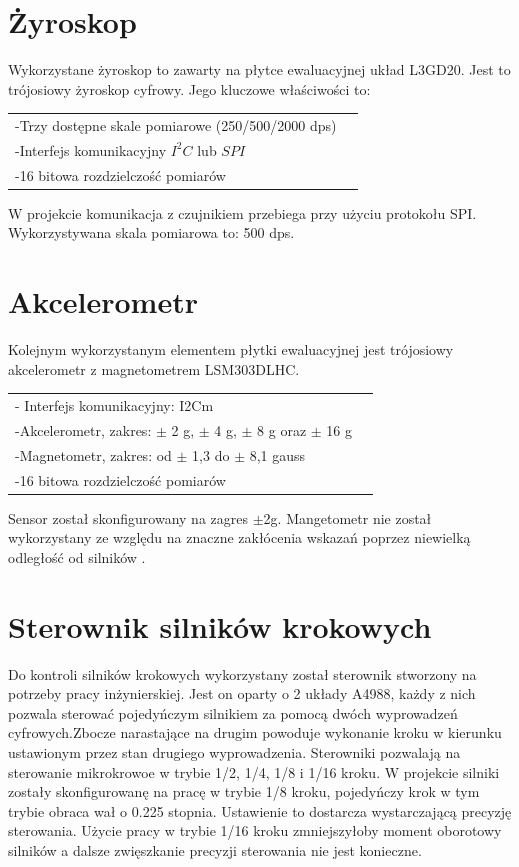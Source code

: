 \section{Żyroskop}

Wykorzystane żyroskop to zawarty na płytce ewaluacyjnej układ L3GD20. Jest to trójosiowy żyroskop cyfrowy. Jego kluczowe właściwości to:

\begin{tabular}{  l   p{3cm} |}
	 -Trzy dostępne skale pomiarowe (250/500/2000 dps) \\
	 -Interfejs komunikacyjny $I^2C$ lub $SPI$\\
	-16 bitowa rozdzielczość pomiarów \\
\end{tabular}  

W projekcie komunikacja z czujnikiem przebiega przy użyciu protokołu SPI. Wykorzystywana skala pomiarowa to: 500 dps.


\section{Akcelerometr}
Kolejnym wykorzystanym elementem płytki ewaluacyjnej jest trójosiowy akcelerometr z magnetometrem LSM303DLHC. 

\begin{tabular}{  l   p{3cm} |}
	- Interfejs komunikacyjny: I2Cm\\
	-Akcelerometr, zakres: $\pm$ 2 g, $\pm$ 4 g, $\pm$ 8 g oraz $\pm$ 16 g\\
	-Magnetometr, zakres:  od $\pm$ 1,3 do $\pm$ 8,1 gauss\\
	-16 bitowa rozdzielczość pomiarów \\
\end{tabular}  


Sensor został skonfigurowany na zagres $\pm$2g. Mangetometr nie został wykorzystany ze względu na znaczne zakłócenia wskazań poprzez niewielką odległość od silników .


\section{Sterownik silników krokowych}

Do kontroli silników krokowych wykorzystany został sterownik stworzony na potrzeby pracy inżynierskiej. Jest on oparty o 2 układy A4988, każdy z nich pozwala sterować pojedyńczym silnikiem za pomocą dwóch wyprowadzeń cyfrowych.Zbocze narastające na drugim powoduje wykonanie kroku w kierunku ustawionym przez stan drugiego wyprowadzenia. Sterowniki pozwalają na sterowanie mikrokrowoe w trybie 1/2, 1/4, 1/8 i 1/16 kroku. W projekcie silniki zostały skonfigurowanę na pracę w trybie 1/8 kroku, pojedyńczy krok w tym trybie obraca wał o 0.225 stopnia.  Ustawienie to dostarcza wystarczającą precyzję sterowania. Użycie pracy w trybie 1/16 kroku zmniejszyłoby moment oborotowy silników a dalsze zwięszkanie precyzji sterowania nie jest konieczne.


